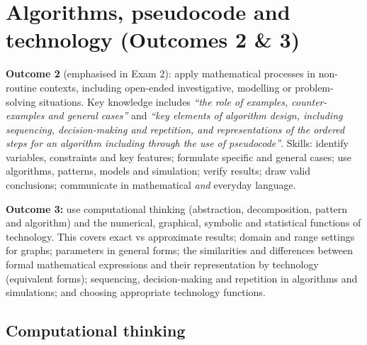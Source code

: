 \section{Algorithms, pseudocode and technology (Outcomes 2 \& 3)}
\label{sec:algorithms}

\begin{sdbox}
\textbf{Outcome 2} (emphasised in Exam 2): apply mathematical processes in non-routine contexts, including open-ended investigative, modelling or problem-solving situations. Key knowledge includes \emph{``the role of examples, counter-examples and general cases''} and \emph{``key elements of algorithm design, including sequencing, decision-making and repetition, and representations of the ordered steps for an algorithm including through the use of pseudocode''}. Skills: identify variables, constraints and key features; formulate specific and general cases; use algorithms, patterns, models and simulation; verify results; draw valid conclusions; communicate in mathematical \emph{and} everyday language.\par
\textbf{Outcome 3:} use computational thinking (abstraction, decomposition, pattern and algorithm) and the numerical, graphical, symbolic and statistical functions of technology. This covers exact vs approximate results; domain and range settings for graphs; parameters in general forms; the similarities and differences between formal mathematical expressions and their representation by technology (equivalent forms); sequencing, decision-making and repetition in algorithms and simulations; and choosing appropriate technology functions.
\end{sdbox}

\subsection{Computational thinking}
\label{sec:ct}

